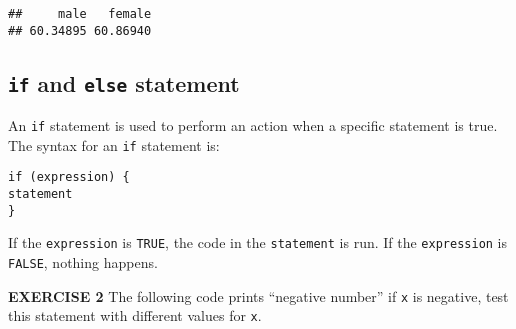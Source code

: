 \documentclass[
]{article}
\newenvironment{Shaded}{\begin{snugshade}}{\end{snugshade}}
\newcommand{\CommentTok}[1]{\textcolor[rgb]{0.56,0.35,0.01}{\textit{#1}}}
\newcommand{\ControlFlowTok}[1]{\textcolor[rgb]{0.13,0.29,0.53}{\textbf{#1}}}
\newcommand{\DataTypeTok}[1]{\textcolor[rgb]{0.13,0.29,0.53}{#1}}
\newcommand{\DecValTok}[1]{\textcolor[rgb]{0.00,0.00,0.81}{#1}}
\newcommand{\KeywordTok}[1]{\textcolor[rgb]{0.13,0.29,0.53}{\textbf{#1}}}
\newcommand{\NormalTok}[1]{#1}
\newcommand{\OperatorTok}[1]{\textcolor[rgb]{0.81,0.36,0.00}{\textbf{#1}}}
\newcommand{\StringTok}[1]{\textcolor[rgb]{0.31,0.60,0.02}{#1}}
\begin{document}
\begin{Shaded}
\end{Shaded}

\begin{verbatim}
##     male   female 
## 60.34895 60.86940
\end{verbatim}

\hypertarget{if-and-else-statement}{%
\subsection{\texorpdfstring{\texttt{if} and \texttt{else}
statement}{if and else statement}}\label{if-and-else-statement}}

An \texttt{if} statement is used to perform an action when a specific
statement is true. The syntax for an \texttt{if} statement is:

\begin{verbatim}
if (expression) {
statement
}
\end{verbatim}

If the \texttt{expression} is \texttt{TRUE}, the code in the
\texttt{statement} is run. If the \texttt{expression} is \texttt{FALSE},
nothing happens.

\textbf{EXERCISE 2} The following code prints ``negative number'' if
\texttt{x} is negative, test this statement with different values for
\texttt{x}.
\end{document}
